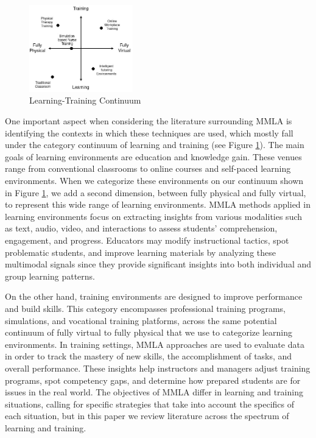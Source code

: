 \documentclass[manuscript,screen,review]{acmart}
\begin{document}
\begin{figure}
    \begin{center}
    \includegraphics[width=0.4\textwidth]{img/LearningTrainingContinuum.jpg}
    \end{center}
    \caption{Learning-Training Continuum}
    \label{fig:ltcontinuum}
\end{figure}


One important aspect when considering the literature surrounding MMLA is identifying the contexts in which these techniques are used, which mostly fall under the category continuum of learning and training (see Figure \ref{fig:ltcontinuum}). The main goals of learning environments are education and knowledge gain. These venues range from conventional classrooms to online courses and self-paced learning environments. When we categorize these environments on our continuum shown in Figure \ref{fig:ltcontinuum}, we add a second dimension, between fully physical and fully virtual, to represent this wide range of learning environments. MMLA methods applied in learning environments focus on extracting insights from various modalities such as text, audio, video, and interactions to assess students' comprehension, engagement, and progress. Educators may modify instructional tactics, spot problematic students, and improve learning materials by analyzing these multimodal signals since they provide significant insights into both individual and group learning patterns.

On the other hand, training environments are designed to improve performance and build skills. This category encompasses professional training programs, simulations, and vocational training platforms, across the same potential continuum of fully virtual to fully physical that we use to categorize learning environments. In training settings, MMLA approaches are used to evaluate data in order to track the mastery of new skills, the accomplishment of tasks, and overall performance. These insights help instructors and managers adjust training programs, spot competency gaps, and determine how prepared students are for issues in the real world. The objectives of MMLA differ in learning and training situations, calling for specific strategies that take into account the specifics of each situation, but in this paper we review literature across the spectrum of learning and training.
\end{document}
